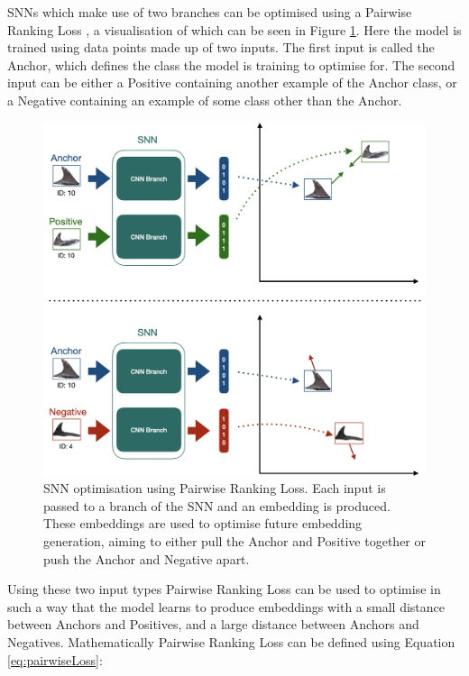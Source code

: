 SNNs which make use of two branches can be optimised using a Pairwise Ranking Loss \cite{burges_learning_2005}, a visualisation of which can be seen in Figure \ref{fig:pairwise_ranking_loss_faces}. Here the model is trained using data points made up of two inputs. The first input is called the Anchor, which defines the class the model is training to optimise for. The second input can be either a Positive containing another example of the Anchor class, or a Negative containing an example of some class other than the Anchor. 

\begin{figure}[h]
	\begin{center}
		\includegraphics[scale=0.5]{Chapter6/figs/pairwise_ranking_loss_faces-updated.png}
	\end{center}
	\caption[SNN optimisation using Pairwise Ranking Loss.]{SNN optimisation using Pairwise Ranking Loss. Each input is passed to a branch of the SNN and an embedding is produced. These embeddings are used to optimise future embedding generation, aiming to either pull the Anchor and Positive together or push the Anchor and Negative apart.}
	\label{fig:pairwise_ranking_loss_faces}
\end{figure}

Using these two input types Pairwise Ranking Loss can be used to optimise in such a way that the model learns to produce embeddings with a small distance between Anchors and Positives, and a large distance between Anchors and Negatives. Mathematically Pairwise Ranking Loss can be defined using Equation \ref{eq:pairwiseLoss}:

